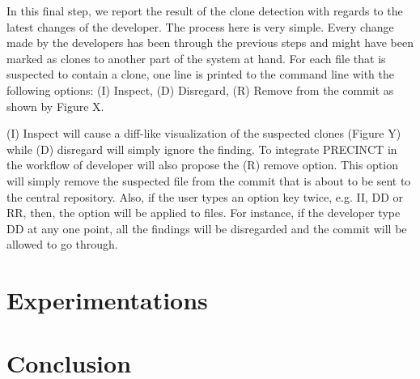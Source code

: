 \documentclass[conference]{IEEEtran}
\begin{document}
In this final step, we report the result of the clone detection with regards to the latest changes of the developer.
The process here is very simple.
Every change made by the developers has been through the previous steps and might have been marked as clones to another part of the system at hand.
For each file that is suspected to contain a clone, one line is printed to the command line with the following options: (I) Inspect, (D) Disregard, (R) Remove from the commit as shown by Figure X.

(I) Inspect will cause a diff-like visualization of the suspected clones (Figure Y) while (D) disregard will simply ignore the finding.
To integrate PRECINCT in the workflow of developer will also propose the (R) remove option.
This option will simply remove the suspected file from the commit that is about to be sent to the central repository.
Also, if the user types an option key twice, e.g. II, DD or RR, then, the option will be applied to files.
For instance, if the developer type DD at any one point, all the findings will be disregarded and the commit will be allowed to go through.







\section{Experimentations}
\label{sec:Experimentations}

\section{Conclusion}
\label{sec:Conclusion}









\end{document}
